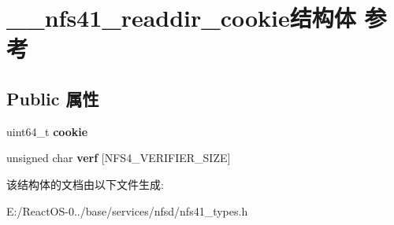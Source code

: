 \hypertarget{struct____nfs41__readdir__cookie}{}\section{\+\_\+\+\_\+nfs41\+\_\+readdir\+\_\+cookie结构体 参考}
\label{struct____nfs41__readdir__cookie}
\subsection*{Public 属性}
\begin{DoxyCompactItemize}
\item 
\mbox{\label{struct____nfs41__readdir__cookie_a19f4691814664715f67e8aaa75e137dc}} 
uint64\+\_\+t {\bfseries cookie}
\item 
\mbox{\label{struct____nfs41__readdir__cookie_a5e3a2b4ba13da4fe5b239a0054b91d75}} 
unsigned char {\bfseries verf} \mbox{[}N\+F\+S4\+\_\+\+V\+E\+R\+I\+F\+I\+E\+R\+\_\+\+S\+I\+ZE\mbox{]}
\end{DoxyCompactItemize}


该结构体的文档由以下文件生成\+:\begin{DoxyCompactItemize}
\item 
E\+:/\+React\+O\+S-\/0../base/services/nfsd/nfs41\+\_\+types.\+h\end{DoxyCompactItemize}
